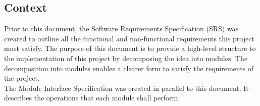 \documentclass[12pt, titlepage]{article}
\begin{document}

\subsection{Context}
Prior to this document, the Software Requirements Specification (SRS) was created to outline all the functional and non-functional requirements this project must satisfy. The purpose of this document is to provide a high-level structure to the implementation of this project by decomposing the idea into modules. The decomposition into modules enables a clearer form to satisfy the requirements of the project.\\

\noindent The Module Interface Specification was created in parallel to this document. It describes the operations that each module shall perform.



\end{document}
